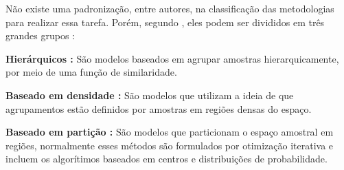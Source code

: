 Não existe uma padronização, entre autores, na classificação das metodologias para realizar essa tarefa. Porém, segundo , eles podem ser divididos em três grandes grupos :
\begin{compactitem}
	\item \textbf{Hierárquicos :} São modelos baseados em agrupar amostras hierarquicamente, por meio de uma função de similaridade. 
	
	\item \textbf{Baseado em densidade :} São modelos que utilizam a ideia de que agrupamentos estão definidos por amostras em regiões densas do espaço.
	
	\item \textbf{Baseado em partição :} São modelos que particionam o espaço amostral em regiões, normalmente esses métodos são formulados por otimização iterativa e incluem os algorítimos baseados em centros e distribuições de probabilidade.
	
\end{compactitem}
%
%
%
